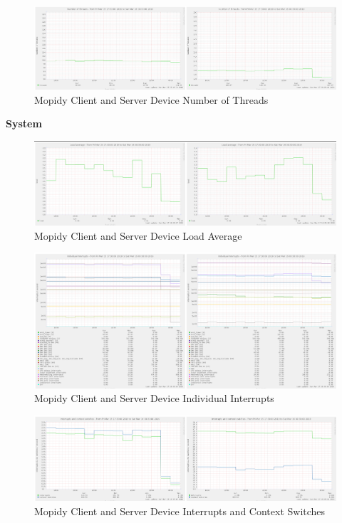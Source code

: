 \documentclass[11pt,a4paper,headinclude=false,footinclude=false]{scrreprt}
\begin{document}
\begin{figure}[H]
\includegraphics{ResultsAndAnalysis/MopidyServerTestImages/019MopidyNoOfThreads.png}
\centering
\caption{Mopidy Client and Server Device Number of Threads}
\label{MopidyNumThreads}
\end{figure}

\textbf{System}

\begin{figure}[H]
\includegraphics{ResultsAndAnalysis/MopidyServerTestImages/016MopidyLoadAverage.png}
\centering
\caption{Mopidy Client and Server Device Load Average}
\label{MopidyLoadAvg}
\end{figure}

\begin{figure}[H]
\includegraphics{ResultsAndAnalysis/MopidyServerTestImages/014MopidyIndividualInterrupts.png}
\centering
\caption{Mopidy Client and Server Device Individual Interrupts}
\label{MopidyIndInt}
\end{figure}

\begin{figure}[H]
\includegraphics{ResultsAndAnalysis/MopidyServerTestImages/015MopidyInterruptsAndContextSwitches.png}
\centering
\caption{Mopidy Client and Server Device Interrupts and Context Switches}
\label{MopidyIntCont}
\end{figure}
\end{document}
